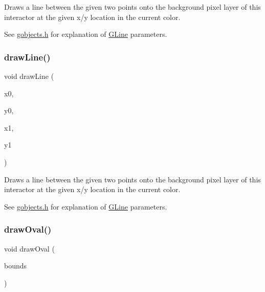 Draws a line between the given two points onto the background pixel layer of this interactor at the given x/y location in the current color. 

See \mbox{\hyperlink{gobjects_8h_source}{gobjects.\+h}} for explanation of \mbox{\hyperlink{classGLine}{G\+Line}} parameters. \mbox{\label{classGDrawingSurface_aff299fe83178d2f3ce8c08c06b583484}} 
\subsubsection{\texorpdfstring{draw\+Line()}{drawLine()}\hspace{0.1cm}{\footnotesize\ttfamily [2/2]}}
{\footnotesize\ttfamily void draw\+Line (\begin{DoxyParamCaption}\item[{double}]{x0,  }\item[{double}]{y0,  }\item[{double}]{x1,  }\item[{double}]{y1 }\end{DoxyParamCaption})\hspace{0.3cm}{\ttfamily [virtual]}}



Draws a line between the given two points onto the background pixel layer of this interactor at the given x/y location in the current color. 

See \mbox{\hyperlink{gobjects_8h_source}{gobjects.\+h}} for explanation of \mbox{\hyperlink{classGLine}{G\+Line}} parameters. \mbox{\label{classGDrawingSurface_a8adc13027efe311b4a6a715205b8bc46}} 
\subsubsection{\texorpdfstring{draw\+Oval()}{drawOval()}\hspace{0.1cm}{\footnotesize\ttfamily [1/2]}}
{\footnotesize\ttfamily void draw\+Oval (\begin{DoxyParamCaption}\item[{const \mbox{\hyperlink{structGRectangle}{G\+Rectangle}} \&}]{bounds }\end{DoxyParamCaption})\hspace{0.3cm}{\ttfamily [virtual]}}



